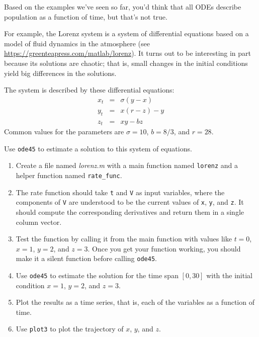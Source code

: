 \begin{ex}


Based on the examples we've seen so far, you'd think that all ODEs describe population as
a function of time, but that's not true.

For example, the Lorenz system is a system of differential equations based on a model of fluid dynamics in the atmosphere
(see \url{https://greenteapress.com/matlab/lorenz}).
It turns out to be interesting in part because its solutions are chaotic; that is, small changes in the initial conditions yield big differences in the solutions.

The system is described by these differential equations:
%
\begin{eqnarray*}
x_t &=& \sigma (y - x)  \\
y_t &=& x (r - z) - y   \\
z_t &=& xy - b z
\end{eqnarray*}
%
Common values for the parameters are $\sigma = 10$, $b = 8/3$, and $r=28$.

Use \lstinline{ode45} to estimate a solution to this system of equations.

\begin{enumerate}

\item Create a file named \emph{lorenz.m} with a main function named \lstinline{lorenz} and a helper function named \lstinline{rate_func}.

\item  The rate function should
take \lstinline{t} and \lstinline{V} as input variables, where the components
of \lstinline{V} are understood to be the current values of \lstinline{x},
\lstinline{y}, and \lstinline{z}.  It should compute the corresponding derivatives
and return them in a single column vector.

\item Test the function by calling it from the main function with values like $t=0$, $x=1$, $y=2$, and $z=3$.
Once you get your function working, you should make it a silent function before calling \lstinline{ode45}.

\item Use \lstinline{ode45} to estimate the solution for the time span $[0, 30]$
with the initial condition $x=1$, $y=2$, and $z=3$.

\item Plot the results as a time series, that is, each of the variables as a function of time.

\item Use \lstinline{plot3} to plot the trajectory of $x$, $y$, and $z$.

\end{enumerate}


\end{ex}
